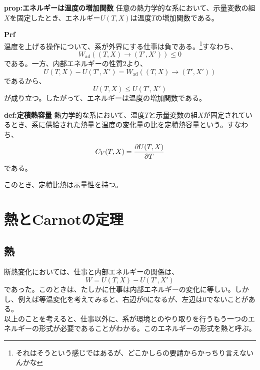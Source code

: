 \documentclass[a4paper,11pt]{jsarticle}
\begin{document}
\begin{itembox}[l]{\textbf{prop:エネルギーは温度の増加関数}}
    任意の熱力学的な系において、示量変数の組$X$を固定したとき、エネルギー$U(T,X)$は温度$T$の増加関数である。

\end{itembox}
\textbf{Prf}\\
温度を上げる操作について、系が外界にする仕事は負である。\footnote{それはそうという感じではあるが、どこかしらの要請からかっちり言えないんかな}すなわち、
\begin{equation}
    W_{\text{ad}}((T,X)\rightarrow (T',X')) \leq 0
\end{equation}
である。一方、内部エネルギーの性質2より、
\begin{equation}
    U(T,X) - U(T',X') = W_{\text{ad}}((T,X)\rightarrow (T',X'))
\end{equation}
であるから、
\begin{equation}
    U(T,X) \leq U(T',X')
\end{equation}
が成り立つ。したがって、エネルギーは温度の増加関数である。\\

\begin{itembox}[l]{\textbf{def:定積熱容量}}
    熱力学的な系において、温度$T$と示量変数の組$X$が固定されているとき、系に供給された熱量と温度の変化量の比を定積熱容量という。すなわち、
    \begin{equation}
        C_V(T,X) = \pdv{U(T,X)}{T}
    \end{equation}
    である。

\end{itembox}
このとき、定積比熱は示量性を持つ。

\section{熱とCarnotの定理}
\subsection{熱}
断熱変化においては、仕事と内部エネルギーの関係は、
\begin{equation}
    W = U(T,X) - U(T',X')
\end{equation}
であった。このときは、たしかに仕事は内部エネルギーの変化に等しい。しかし、例えば等温変化を考えてみると、右辺が$0$になるが、左辺は$0$でないことがある。\\
以上のことを考えると、仕事以外に、系が環境とのやり取りを行うもう一つのエネルギーの形式が必要であることがわかる。このエネルギーの形式を熱と呼ぶ。\\
\end{document}
